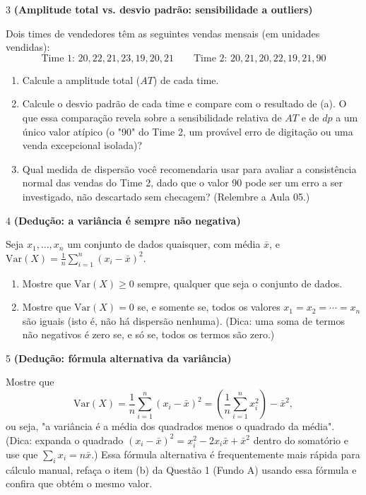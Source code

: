 \documentclass[11pt]{article}
\begin{document}
\begin{questao}{3} \textbf{(Amplitude total vs. desvio padrão: sensibilidade a outliers)}

Dois times de vendedores têm as seguintes vendas mensais (em unidades vendidas):
$$
\text{Time 1: } 20, 22, 21, 23, 19, 20, 21 \qquad
\text{Time 2: } 20, 21, 20, 22, 19, 21, 90
$$

\begin{enumerate}[label=(\alph*)]
  \item Calcule a amplitude total ($AT$) de cada time.
  \item Calcule o desvio padrão de cada time e compare com o resultado de (a). O que essa
    comparação revela sobre a sensibilidade relativa de $AT$ e de $dp$ a um único valor atípico
    (o "90" do Time 2, um provável erro de digitação ou uma venda excepcional isolada)?
  \item Qual medida de dispersão você recomendaria usar para avaliar a consistência normal das
    vendas do Time 2, dado que o valor 90 pode ser um erro a ser investigado, não descartado sem
    checagem? (Relembre a Aula 05.)
\end{enumerate}
\end{questao}

\begin{questao}{4} \textbf{(Dedução: a variância é sempre não negativa)}

Seja $x_1, \ldots, x_n$ um conjunto de dados quaisquer, com média $\bar x$, e
$\mathrm{Var}(X) = \frac{1}{n}\sum_{i=1}^n (x_i-\bar x)^2$.

\begin{enumerate}[label=(\alph*)]
  \item Mostre que $\mathrm{Var}(X) \ge 0$ sempre, qualquer que seja o conjunto de dados.
  \item Mostre que $\mathrm{Var}(X) = 0$ se, e somente se, todos os valores $x_1=x_2=\cdots=x_n$
    são iguais (isto é, não há dispersão nenhuma). (Dica: uma soma de termos não negativos é zero
    se, e só se, todos os termos são zero.)
\end{enumerate}
\end{questao}

\begin{questao}{5} \textbf{(Dedução: fórmula alternativa da variância)}

Mostre que
$$
\mathrm{Var}(X) = \frac{1}{n}\sum_{i=1}^n (x_i-\bar x)^2 = \left(\frac{1}{n}\sum_{i=1}^n x_i^2\right) - \bar{x}^2,
$$
ou seja, "a variância é a média dos quadrados menos o quadrado da média". (Dica: expanda o
quadrado $(x_i-\bar x)^2 = x_i^2 - 2x_i\bar x + \bar x^2$ dentro do somatório e use que
$\sum_i x_i = n\bar x$.) Essa fórmula alternativa é frequentemente mais rápida para cálculo manual, refaça o item (b) da Questão 1 (Fundo A) usando essa fórmula e confira que obtém o mesmo valor.
\end{questao}
\end{document}
